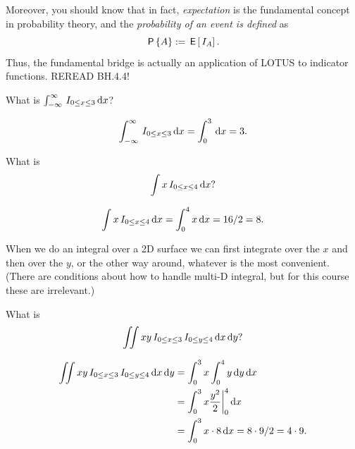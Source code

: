 \documentclass[lectures]{subfiles}
\begin{document}
Moreover, you should know that in fact, \emph{expectation} is the fundamental concept in probability theory, and the \emph{probability of an event is defined} as
\begin{equation}
  \label{eq:84}
  \,\mathsf{P}\left\{A\right\} := \,\mathsf{E}\left[\,I_{A}\right].
\end{equation}
Thus, the fundamental bridge is actually an application of LOTUS to indicator functions. REREAD BH.4.4!


\begin{exercise}
What is $\int_{-\infty}^{\infty} \,I_{0\leq x \leq 3} \,\textrm{d}x$?
\begin{solution}
\begin{align*}
\int_{-\infty}^{\infty} \,I_{0\leq x \leq 3} \,\textrm{d}x =\int_{0}^{3}  \,\textrm{d}x  = 3.
\end{align*}
\end{solution}
\end{exercise}

\begin{exercise}
What is
\begin{equation}
\label{eq:85}
\int x \,I_{0\leq x \leq 4} \,\textrm{d}x?
\end{equation}
\begin{solution}
\begin{align*}
\int x \,I_{0\leq x \leq 4} \,\textrm{d}x  = \int_{0}^{4} x \,\textrm{d}x = 16/2 = 8.
\end{align*}
\end{solution}
\end{exercise}

When we do an integral over a 2D surface we can first integrate over the $x$ and then over the $y$, or the other way around, whatever is the most convenient.
(There are conditions about how to handle multi-D integral, but for this course these are irrelevant.)

\begin{exercise}
What is
\begin{equation}
\label{eq:185}
\iint x y \,I_{0\leq x \leq 3}\,I_{0\leq y \leq 4} \,\textrm{d}x \,\textrm{d}y?
\end{equation}
\begin{solution}
\begin{align*}
\iint xy \,I_{0\leq x \leq 3}\,I_{0\leq y \leq 4} \,\textrm{d}x \,\textrm{d}y
&=\int_{0}^{3} x \int_{0}^{4} y \,\textrm{d}y \,\textrm{d}x\\
&=\int_{0}^{3} x \frac{y^{2}} 2 \biggr|_{0}^{4} \,\textrm{d}x\\
&= \int_{0}^{3} x\cdot 8 \,\textrm{d}x = 8\cdot 9/2 = 4\cdot 9.
\end{align*}
\end{solution}
\end{exercise}
\end{document}

